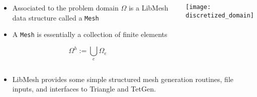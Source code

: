 \begin{frame}
  \begin{columns}[t]
    \begin{block}{}%
      \begin{itemize}
      \item{
	Associated to the problem domain $\Omega$ is a LibMesh data
	structure called a \texttt{Mesh}
      }
	
      \item{A \texttt{Mesh} is essentially
	a collection of finite elements}
      \end{itemize}
      \begin{equation}
	\label{eqn:discretized_domain}
	\nonumber
	\Omega^h:=\bigcup_e \Omega_e
      \end{equation}
    \end{block}
      \begin{center}
	\texttt{[image: discretized\_domain]}
      \end{center}
  \end{columns}
  {
  \begin{itemize}
    \item{LibMesh provides some simple structured mesh generation
routines, file inputs, and interfaces to Triangle and TetGen.}
  \end{itemize}
  }
\end{frame}


